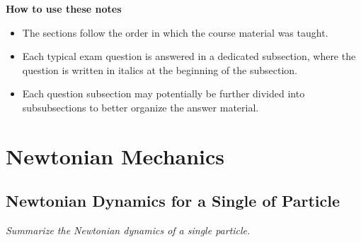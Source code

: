 \documentclass[11pt, a4paper]{article}
\begin{document}
\vspace{5mm}
\textbf{How to use these notes}
\begin{itemize}
    \item The sections follow the order in which the course material was taught.

    \item Each typical exam question is answered in a dedicated subsection, where the question is written in italics at the beginning of the subsection.
    
    \item Each question subsection may potentially be further divided into subsubsections to better organize the answer material.


\end{itemize}

\newpage

\tableofcontents

\newpage

\pagestyle{headerstyle}
\section{Newtonian Mechanics}

\subsection{Newtonian Dynamics for a Single of Particle}
\textit{Summarize the Newtonian dynamics of a single particle.}
\end{document}
